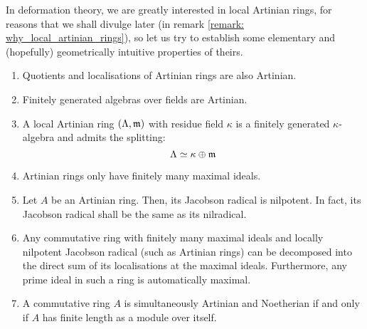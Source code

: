             \begin{proposition} \label{prop: artinian_rings_properties}
                In deformation theory, we are greatly interested in local Artinian rings, for reasons that we shall divulge later (in remark \ref{remark: why_local_artinian_rings}), so let us try to establish some elementary and (hopefully) geometrically intuitive properties of theirs.
                    \begin{enumerate}
                        \item Quotients and localisations of Artinian rings are also Artinian.
                        \item \cite[\href{https://stacks.math.columbia.edu/tag/00J6}{Tag 00J6}]{stacks} Finitely generated algebras over fields are Artinian.
                        \item A local Artinian ring $(\Lambda, \mathfrak{m})$ with residue field $\kappa$ is a finitely generated $\kappa$-algebra and admits the splitting:
                            $$\Lambda \simeq \kappa \oplus \mathfrak{m}$$
                        \item \cite[\href{https://stacks.math.columbia.edu/tag/00J7}{Tag 00J7}]{stacks} Artinian rings only have finitely many maximal ideals.
                        \item \cite[\href{https://stacks.math.columbia.edu/tag/00J8}{Tag 00J8}]{stacks} Let $A$ be an Artinian ring. Then, its Jacobson radical is nilpotent. In fact, its Jacobson radical shall be the same as its nilradical.
                        \item \cite[\href{https://stacks.math.columbia.edu/tag/00JA}{Tag 00JA}]{stacks} Any commutative ring with finitely many maximal ideals and locally nilpotent Jacobson radical (such as Artinian rings) can be decomposed into the direct sum of its localisations at the maximal ideals. Furthermore, any prime ideal in such a ring is automatically maximal.
                        \item \cite[\href{https://stacks.math.columbia.edu/tag/00JB}{Tag 00JB}]{stacks} A commutative ring $A$ is simultaneously Artinian and Noetherian if and only if $A$ has finite length as a module over itself. 
                    \end{enumerate}
            \end{proposition}
